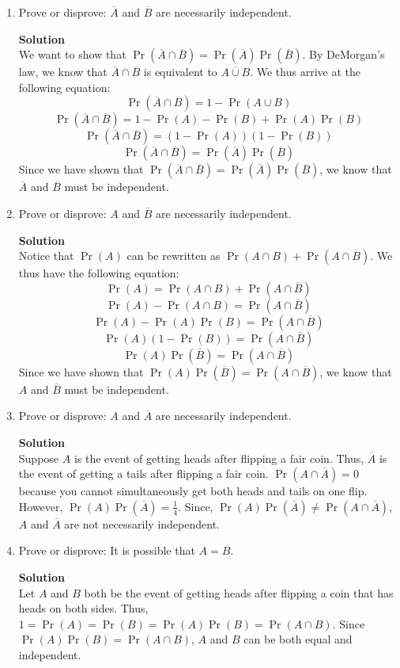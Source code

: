 \documentclass[11pt]{article}
\newenvironment{Parts}{\begin{enumerate}[label=(\alph*)]}{\end{enumerate}}
\newcommand*{\Part}{\item}
\newenvironment{Answer}{\vspace{10pt}\begin{mdframed}\textbf{Solution}\\}{\end{mdframed}\vfill\pagebreak[3]}
\newenvironment{Answer}{\vspace{10pt}}{\vfill\pagebreak[3]}
\begin{document}
\begin{Parts}

\Part Prove or disprove: $\overline{A}$ and $\overline{B}$ are necessarily independent.
\begin{Answer}
    We want to show that $\Pr(\overline{A} \cap \overline{B})=\Pr(\overline{A})\Pr(\overline{B})$. By DeMorgan's law, we know that $\overline{A} \cap \overline{B}$ is equivalent to $\overline{A \cup B}$. We thus arrive at the following equation: $$\Pr(\overline{A} \cap \overline{B})=1-\Pr(A \cup B)$$ $$\Pr(\overline{A} \cap \overline{B})=1-\Pr(A)-\Pr(B)+\Pr(A)\Pr(B)$$ $$\Pr(\overline{A} \cap \overline{B})=(1-\Pr(A))(1-\Pr(B))$$ $$\Pr(\overline{A} \cap \overline{B})=\Pr(\overline{A})\Pr(\overline{B})$$
    Since we have shown that $\Pr(\overline{A} \cap \overline{B})=\Pr(\overline{A})\Pr(\overline{B})$, we know that $\overline{A}$ and $\overline{B}$ must be independent.
\end{Answer}

\Part Prove or disprove: $A$ and $\overline{B}$ are necessarily independent.
\begin{Answer}
    Notice that $\Pr(A)$ can be rewritten as $\Pr(A \cap B)+\Pr(A \cap \overline{B})$. We thus have the following equation: $$\Pr(A)=\Pr(A \cap B)+\Pr(A \cap \overline{B})$$ $$\Pr(A)-\Pr(A \cap B)=\Pr(A \cap \overline{B})$$ $$\Pr(A)-\Pr(A)\Pr(B)=\Pr(A \cap \overline{B})$$ $$\Pr(A)(1-\Pr(B))=\Pr(A \cap \overline{B})$$ $$\Pr(A)\Pr(\overline{B})=\Pr(A \cap \overline{B})$$ Since we have shown that $\Pr(A)\Pr(\overline{B})=\Pr(A \cap \overline{B})$, we know that $A$ and $\overline{B}$ must be independent.
\end{Answer} 

\Part Prove or disprove: $A$ and $\overline{A}$ are necessarily independent.
\begin{Answer}
    Suppose $A$ is the event of getting heads after flipping a fair coin. Thus, $\overline{A}$ is the event of getting a tails after flipping a fair coin. $\Pr(A \cap \overline{A})=0$ because you cannot simultaneously get both heads and tails on one flip. However, $\Pr(A)\Pr(\overline{A})=\frac{1}{4}$. Since, $\Pr(A)\Pr(\overline{A}) \not = \Pr(A \cap \overline{A})$, $A$ and $\overline{A}$ are not necessarily independent.
\end{Answer}

\Part Prove or disprove: It is possible that $A=B$.
\begin{Answer}
    Let $A$ and $B$ both be the event of getting heads after flipping a coin that has heads on both sides. Thus, $1=\Pr(A)=\Pr(B)=\Pr(A)\Pr(B)=\Pr(A \cap B)$. Since $\Pr(A)\Pr(B)=\Pr(A \cap B)$, $A$ and $B$ can be both equal and independent.
\end{Answer}

\end{Parts}
\end{document}
